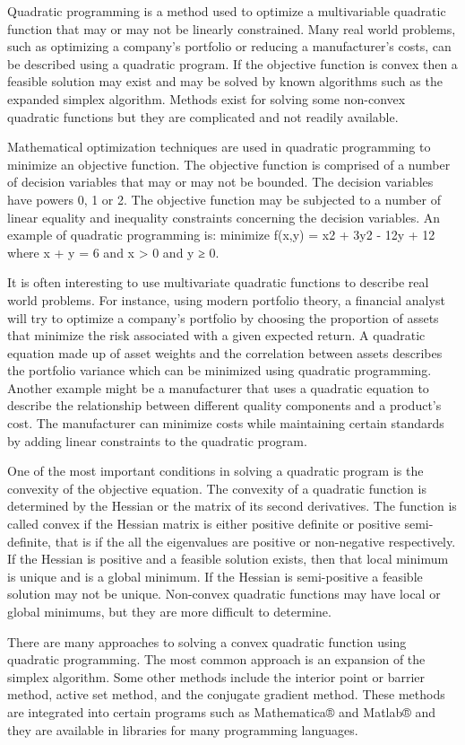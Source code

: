 Quadratic programming is a method used to optimize a multivariable quadratic function that may or may not be linearly constrained. Many real world problems, such as optimizing a company’s portfolio or reducing a manufacturer’s costs, can be described using a quadratic program. If the objective function is convex then a feasible solution may exist and may be solved by known algorithms such as the expanded simplex algorithm. Methods exist for solving some non-convex quadratic functions but they are complicated and not readily available.

Mathematical optimization techniques are used in quadratic programming to minimize an objective function. The objective function is comprised of a number of decision variables that may or may not be bounded. The decision variables have powers 0, 1 or 2. The objective function may be subjected to a number of linear equality and inequality constraints concerning the decision variables. An example of quadratic programming is: minimize f(x,y) = x2 + 3y2 - 12y + 12 where x + y = 6 and x > 0 and y ≥ 0.

It is often interesting to use multivariate quadratic functions to describe real world problems. For instance, using modern portfolio theory, a financial analyst will try to optimize a company's portfolio by choosing the proportion of assets that minimize the risk associated with a given expected return. A quadratic equation made up of asset weights and the correlation between assets describes the portfolio variance which can be minimized using quadratic programming. Another example might be a manufacturer that uses a quadratic equation to describe the relationship between different quality components and a product's cost. The manufacturer can minimize costs while maintaining certain standards by adding linear constraints to the quadratic program.

One of the most important conditions in solving a quadratic program is the convexity of the objective equation. The convexity of a quadratic function is determined by the Hessian or the matrix of its second derivatives. The function is called convex if the Hessian matrix is either positive definite or positive semi-definite, that is if the all the eigenvalues are positive or non-negative respectively. If the Hessian is positive and a feasible solution exists, then that local minimum is unique and is a global minimum. If the Hessian is semi-positive a feasible solution may not be unique. Non-convex quadratic functions may have local or global minimums, but they are more difficult to determine.

There are many approaches to solving a convex quadratic function using quadratic programming. The most common approach is an expansion of the simplex algorithm. Some other methods include the interior point or barrier method, active set method, and the conjugate gradient method. These methods are integrated into certain programs such as Mathematica® and Matlab® and they are available in libraries for many programming languages.

